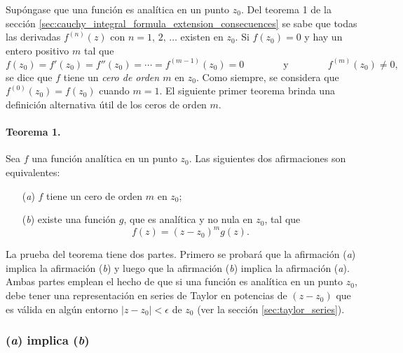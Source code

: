 \documentclass[a4paper]{report}
\begin{document}
Supóngase que una función es analítica en un punto \(z_0\). Del teorema 1 de la sección \ref{sec:cauchy_integral_formula_extension_consecuences} se sabe que todas las derivadas \(f^{(n)}(z)\) con \(n=1,\,2,\,\dots\) existen en \(z_0\). Si \(f(z_0)=0\) y hay un entero positivo \(m\) tal que 
\begin{equation}\label{eq:zero_order_m_condition}
 f(z_0)=f'(z_0)=f''(z_0)=\cdots=f^{(m-1)}(z_0)=0 
 \qquad\qquad\textrm{y}\qquad\qquad
 f^{(m)}(z_0)\neq0,
\end{equation}
se dice que \(f\) tiene un \emph{cero de orden \(m\)} en \(z_0\). Como siempre, se considera que \(f^{(0)}(z_0)=f(z_0)\) cuando \(m=1\). El siguiente primer teorema brinda una definición alternativa útil de los  ceros de orden \(m\).

\paragraph{Teorema 1.} Sea \(f\) una función analítica en un punto \(z_0\). Las siguientes dos afirmaciones son equivalentes:
\begin{enumerate}
 \item[(\textit{a})] \(f\) tiene un cero de orden \(m\) en \(z_0\);
 \item[(\textit{b})] existe una función \(g\), que es analítica y no nula en \(z_0\), tal que 
 \begin{equation}\label{eq:zero_order_m_condition_alt}
  f(z)=(z-z_0)^mg(z).  
 \end{equation}
\end{enumerate}

La prueba del teorema tiene dos partes. Primero se probará que la afirmación (\textit{a}) implica la afirmación (\textit{b}) y luego que la afirmación (\textit{b}) implica la afirmación (\textit{a}). Ambas partes emplean el hecho de que si una función es analítica en un punto \(z_0\), debe tener una representación en series de Taylor en potencias de \((z-z_0)\) que es válida en algún entorno \(|z-z_0|<\epsilon\) de \(z_0\) (ver la sección \ref{sec:taylor_series}).

\subsubsection*{(\textit{a}) implica (\textit{b})}
\end{document}
